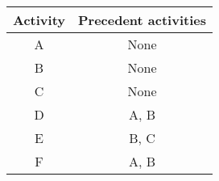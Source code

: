 \begin{center}
\begin{tabular}{|c|c|}
\hline
\textbf{Activity} & \textbf{Precedent activities} \\
\hline
A & None \\
\hline
B & None \\
\hline
C & None\\
\hline
D & A, B \\
\hline
E & B, C \\
\hline
F & A, B \\
\hline
\end{tabular}
\end{center}
